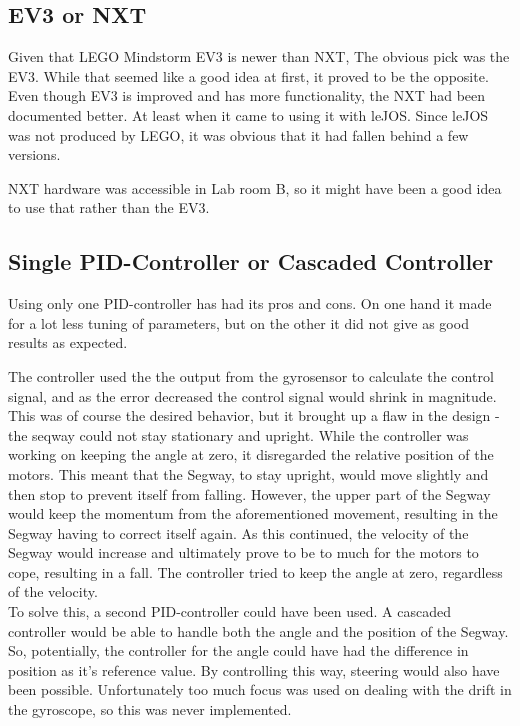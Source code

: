 \subsection{EV3 or NXT}
Given that LEGO Mindstorm EV3 is newer than NXT, The obvious pick was the EV3. While that seemed like a good idea at first, it proved to be the opposite. Even though EV3 is improved and has more functionality, the NXT had been documented better. At least when it came to using it with leJOS. Since leJOS was not produced by LEGO, it was obvious that it had fallen behind a few versions.

NXT hardware was accessible in Lab room B, so it might have been a good idea to use that rather than the EV3.

\subsection{Single PID-Controller or Cascaded Controller}
Using only one PID-controller has had its pros and cons. On one hand it made for a lot less tuning of parameters, but on the other it did not give as good results as expected.

The controller used the the output from the gyrosensor to calculate the control signal, and as the error decreased the control signal would shrink in magnitude. This was of course the desired behavior, but it brought up a flaw in the design - the seqway could not stay stationary and upright. While the controller was working on keeping the angle at zero, it disregarded the relative position of the motors. This meant that the Segway, to stay upright, would move slightly and then stop to prevent itself from falling. However, the upper part of the Segway would keep the momentum from the aforementioned movement, resulting in the Segway having to correct itself again. As this continued, the velocity of the Segway would increase and ultimately prove to be to much for the motors to cope, resulting in a fall. The controller tried to keep the angle at zero, regardless of the velocity.
\\[3ex]
To solve this, a second PID-controller could have been used. A cascaded controller would be able to handle both the angle and the position of the Segway. So, potentially, the controller for the angle could have had the difference in position as it's reference value. By controlling this way, steering would also have been possible. Unfortunately too much focus was used on dealing with the drift in the gyroscope, so this was never implemented.


